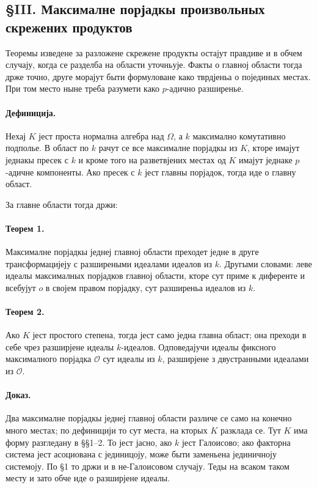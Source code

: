 ﻿\documentclass[11pt]{article}
\begin{document}
\subsection*{§III. Максималне порјадкы произвольных скрежених продуктов}

Теоремы изведене за разложене скрежене продукты остајут правдиве и в обчем случају, когда се разделба на области уточньује. Факты о главној области тогда држе точно, друге морајут быти формуловане како тврдјеньа о појединых местах. При том место ныне треба разумети како \(p\)-адично разширенье.

\paragraph{Дефиниција.}
Нехај \(K\) јест проста нормална алгебра над \(\Omega\), а \(k\) максимално комутативно подполье. В област по \(k\) рачут се все максималне порјадкы из \(K\), кторе имајут једнакы пресек с \(k\) и кроме того на разветвјених местах од \(K\) имајут једнаке \(p\)-адичне компоненты. Ако пресек с \(k\) јест главны порјадок, тогда иде о главну област.

За главне области тогда држи:

\paragraph{Теорем 1.}
Максималне порјадкы једнеј главној области преходет једне в друге трансформацијеју с разширеными идеалами идеалов из \(k\). Другыми словами: леве идеалы максималных порјадков главној области, кторе сут приме к диференте и всебујут \(o\) в својем правом порјадку, сут разширеньа идеалов из \(k\).

\paragraph{Теорем 2.}
Ако \(K\) јест простого степена, тогда јест само једна главна област; она преходи в себе чрез разширјене идеалы \(k\)-идеалов. Одповедајучи идеалы фиксного максималного порјадка \(\mathcal O\) сут идеалы из \(k\), разширјене з двустранными идеалами из \(\mathcal O\).

\paragraph{Доказ.}
Два максималне порјадкы једнеј главној области различе се само на конечно много местах; по дефиницији то сут места, на кторых \(K\) разклада се. Тут \(K\) има форму разгледану в §§1--2. То јест јасно, ако \(k\) јест Галоисово; ако факторна система јест асоциована с јединицоју, може быти заменьена јединичноју системоју. По §1 то држи и в не-Галоисовом случају. Теды на всаком таком месту и зато обче иде о разширјене идеалы.
\end{document}
